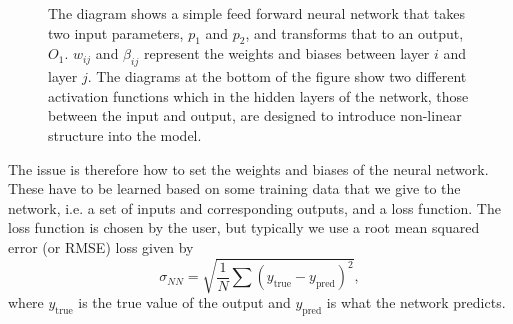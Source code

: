 \begin{figure}[h!]
    \caption{The diagram shows a simple feed forward neural network that takes two input parameters, $p_1$ and $p_2$, and transforms that to an output, $O_1$. $w_{ij}$ and $\beta_{ij}$ represent the weights and biases between layer $i$ and layer $j$. The diagrams at the bottom of the figure show two different activation functions which in the hidden layers of the network, those between the input and output, are designed to introduce non-linear structure into the model.}
    \label{fig:neural_network}
\end{figure}

The issue is therefore how to set the weights and biases of the neural network. These have to be learned based on some training data that we give to the network, i.e. a set of inputs and corresponding outputs, and a loss function. The loss function is chosen by the user, but typically we use a root mean squared error (or RMSE) loss given by
\begin{equation}
    \sigma_{NN} = \sqrt{\frac{1}{N}\sum (y_\mathrm{true}-y_\mathrm{pred})^2},
    \label{eq:loss_intro}
\end{equation}
where $y_\mathrm{true}$ is the true value of the output and $y_\mathrm{pred}$ is what the network predicts.

